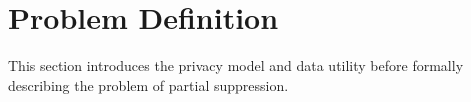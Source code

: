 \section{Problem Definition}
\label{sec:prob}

This section 
introduces the privacy model and data utility before formally describing
the problem of partial suppression.


